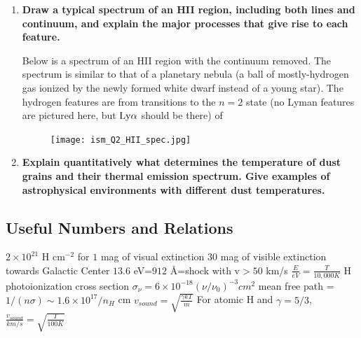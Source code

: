 \begin{enumerate}
\item \textbf{Draw a typical spectrum of an HII region, including both lines and continuum, and
      explain the major processes that give rise to each feature.}
      
      Below is a spectrum of an HII region with the continuum removed. The spectrum is similar to that of a planetary nebula (a ball of mostly-hydrogen gas ionized by the newly formed white dwarf instead of a young star). The hydrogen features are from transitions to the $n=2$ state (no Lyman features are pictured here, but ${\rm Ly}\alpha$ should be there) of 
      
      \begin{figure}[!h]
      \begin{center}
      \texttt{[image: ism\_Q2\_HII\_spec.jpg]}
      \end{center}
	\end{figure}
\item \textbf{Explain quantitatively what determines the temperature of dust grains and their
      thermal emission spectrum. Give examples of astrophysical environments with different
      dust temperatures.}
\end{enumerate}

\subsection{Useful Numbers and Relations}
$2\times10^{21}$ H cm$^{-2}$ for $1$ mag of visual extinction\newline
\newline
$30$ mag of visible extinction towards Galactic Center\newline
\newline
$13.6$ eV=$912$ \AA=shock with v$>50$ km/s\newline
\newline
$\frac{E}{eV}=\frac{T}{10,000 K}$\newline
\newline
H photoionization cross section $\sigma_{\nu}=6\times10^{-18}(\nu/\nu_0)^{-3}
cm^2$\newline
\newline
mean free path = $1/(n\sigma)\sim 1.6\times10^{17}/n_H$ cm\newline
\newline
$v_{sound}=\sqrt{\frac{\gamma kT}{m}}$\newline
\newline
For atomic H and $\gamma=5/3$,\newline
\newline
$\frac{v_{sound}}{km/s}=\sqrt{\frac{T}{100 K}}$

